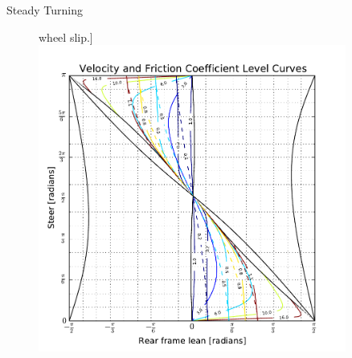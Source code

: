 \documentclass[final]{beamer}
\newlength{\sepwid}
\newlength{\onecolwid}
\begin{document}
{\begin{center}
\begin{columns}[t]
\begin{column}{\onecolwid}
\begin{block}{Steady Turning}
{\begin{figure}[h]
\begin{center}
        wheel slip.]{\includegraphics{steady_benchmark_vmew.pdf}}

        \caption{}
      \end{center}
    \end{figure}
  }
  \end{block}

\end{column}

\begin{column}{\sepwid}\end{column} %

\begin{column}{\onecolwid}


\end{column}
\end{columns}
\end{center}}
\end{document}
